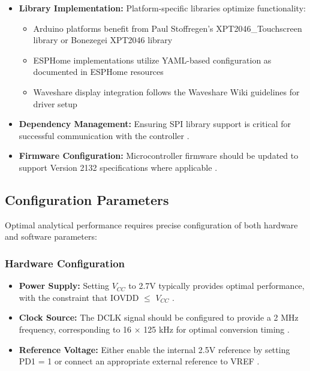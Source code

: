 \begin{itemize}
	\item \textbf{Library Implementation:} Platform-specific libraries optimize functionality:
	\begin{itemize}
		\item Arduino platforms benefit from Paul Stoffregen's XPT2046\_Touchscreen library \cite{Stoffregen:2023} or Bonezegei XPT2046 library \cite{Bonezegei:2024}
		\item ESPHome implementations utilize YAML-based configuration as documented in ESPHome resources \cite{ESPHome:2024}
		\item Waveshare display integration follows the Waveshare Wiki guidelines for driver setup \cite{Waveshare:2024}
	\end{itemize}
	
	\item \textbf{Dependency Management:} Ensuring SPI library support is critical for successful communication with the controller \cite{Stoffregen:2023, Bonezegei:2024}.
	
	\item \textbf{Firmware Configuration:} Microcontroller firmware should be updated to support Version 2132 specifications where applicable \cite{ESPHome:2024}.
\end{itemize}

\subsection{Configuration Parameters}
Optimal analytical performance requires precise configuration of both hardware and software parameters:

\subsubsection{Hardware Configuration}
\begin{itemize}
	\item \textbf{Power Supply:} Setting $V_{CC}$ to 2.7V typically provides optimal performance, with the constraint that IOVDD $\leq$ $V_{CC}$ \cite{xpt2046:2007}.
	
	\item \textbf{Clock Source:} The DCLK signal should be configured to provide a 2 MHz frequency, corresponding to 16 × 125 kHz for optimal conversion timing \cite{xpt2046:2007}.
	
	\item \textbf{Reference Voltage:} Either enable the internal 2.5V reference by setting PD1 = 1 or connect an appropriate external reference to VREF \cite{xpt2046:2007}.
\end{itemize}

